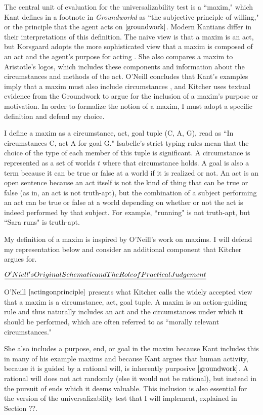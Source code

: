 \begin{isabellebody}
\begin{isamarkuptext}
The central unit of evaluation for the universalizability test is a ``maxim," which Kant defines 
in a footnote in \emph{Groundworkd} as ``the subjective principle of willing," or the principle that 
the agent acts on $\cite[16]{groundwork}$. Modern Kantians differ in their interpretations of this definition. The naive view 
is that a maxim is an act, but Korsgaard adopts the more sophisticated view that a maxim is composed
of an act and the agent's purpose for acting \cite{actingforareason}. She also compares a maxim 
to Aristotle's logos, which includes these components and information about the circumstances and methods 
of the act. O'Neill concludes that Kant's examples imply that a maxim must also include circumstances \cite{actingonprinciple}, and 
Kitcher \cite{whatisamaxim} uses textual evidence from the Groundwork to argue for the inclusion of a maxim's purpose 
or motivation. In order to formalize the notion of a maxim, I must adopt a specific definition and 
defend my choice.

I define a maxim as a circumstance, act, goal tuple (C, A, G), read 
as ``In circumstances C, act A for goal G." Isabelle's strict typing rules mean that the choice of the 
type of each member of this tuple is significant. A circumstance is represented as a set of worlds 
$t$ where that circumstance holds. A goal is also a term because it can be true or false at a world if it 
is realized or not. An act is an open sentence because an act itself is not the kind of thing that can 
be true or false (as in, an act is not truth-apt), but the combination of a subject performing an act 
can be true or false at a world depending on whether or not the act is indeed performed by that subject. 
For example, ``running" is not truth-apt, but ``Sara runs" is truth-apt.

My definition of a maxim is inspired by O'Neill's work on maxims. I will defend my representation
below and consider an additional component that Kitcher argues for.

$\emph{O'Niell's Original Schematic and The Role of Practical Judgement}$

O'Neill $\cite[37]{actingonprinciple}$ presents what Kitcher \cite{whatisamaxim}  calls the widely accepted 
view that a maxim is a circumstance, act, goal tuple. A maxim 
is an action-guiding rule and thus naturally includes an act and the circumstances under which 
it should be performed, which are often referred to as ``morally relevant circumstances." 

She also includes a purpose, end, or goal in the maxim because Kant includes this in many of his 
example maxims and because Kant argues that human activity, because it is guided by a rational will, 
is inherently purposive $\cite[4:428]{groundwork}$. A rational will does not act randomly (else it would not be rational), 
but instead in the pursuit of ends which it deems valuable. This inclusion is also essential for the version of the universalizability test 
that I will implement, explained in Section ??.


\end{isamarkuptext}
\end{isabellebody}
